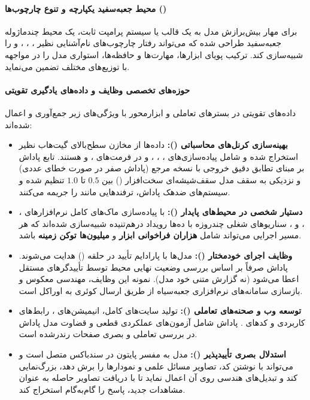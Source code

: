 \paragraph*{محیط جعبه‌سفید یکپارچه و تنوع چارچوب‌ها ()}
برای مهار بیش‌برازش مدل به یک قالب یا سیستم پرامپت ثابت، یک محیط چندماژوله جعبه‌سفید طراحی شده که می‌تواند رفتار چارچوب‌های نام‌آشنایی نظیر  \cite{kimicli2026}،  \cite{claudecode2026}،  \cite{codex2026}،  \cite{openclaw2026} و  \cite{hermes2026} را شبیه‌سازی کند. ترکیب پویای ابزارها، مهارت‌ها و حافظه‌ها، استواری مدل را در مواجهه با توزیع‌های مختلف تضمین می‌نماید.

\paragraph*{حوزه‌های تخصصی وظایف و داده‌های یادگیری تقویتی}
داده‌های تقویتی در بسترهای تعاملی و ابزارمحور با ویژگی‌های زیر جمع‌آوری و اعمال شده‌اند:
\begin{itemize}
    \item \textbf{بهینه‌سازی کرنل‌های محاسباتی  ():} داده‌ها از مخازن سطح‌بالای گیت‌هاب نظیر  \cite{yang2024fla} استخراج شده و شامل پیاده‌سازی‌های ،  \cite{tillet2019triton}، ،  \cite{spector2025thunderkittens} و  \cite{wang2025tilelang} در فرمت‌های ،  و  هستند. تابع پاداش بر مبنای تطابق دقیق خروجی با نسخه مرجع  (پاداش صفر در صورت خطای عددی) و نزدیکی به سقف مدل سقف‌شیشه‌ای سخت‌افزار () بین $0.5$ تا $1.0$ تنظیم شده و سیستم‌های ضدهک پاداش، ترفندهایی مانند  را جریمه می‌کنند.
    \item \textbf{دستیار شخصی در محیط‌های پایدار ():} با پیاده‌سازی ماک‌های کامل نرم‌افزارهای ، ،  و ، سناریوهای شغلی چندروزه با ده‌ها رویداد درهم‌تنیده شبیه‌سازی شده‌اند که هر مسیر اجرایی می‌تواند شامل \textbf{هزاران فراخوانی ابزار} و \textbf{میلیون‌ها توکن زمینه} باشد.
    \item \textbf{وظایف اجرای خودمختار ():} مدل‌ها با پارادایم تأیید در حلقه () هدایت می‌شوند. پاداش صرفاً بر اساس بررسی وضعیت نهایی محیط توسط تأییدگرهای مستقل اعطا می‌شود (نه گزارش متنی خود مدل). نمونه این وظایف، مهندسی معکوس و بازسازی سامانه‌های نرم‌افزاری جعبه‌سیاه از طریق ارسال کوئری به اوراکل است.
    \item \textbf{توسعه وب و صحنه‌های تعاملی ():} تولید سایت‌های کامل، انیمیشن‌های ، رابط‌های کاربردی و کدهای . پاداش شامل آزمون‌های عملکردی قطعی و قضاوت مدل پاداش در بررسی تعاملی و بصری صفحات رندرشده است.
    \item \textbf{استدلال بصری تأییدپذیر ():} مدل به مفسر پایتون در سندباکس متصل است و می‌تواند با نوشتن کد، تصاویر مسائل علمی و نمودارها را برش دهد، بزرگ‌نمایی کند و تبدیل‌های هندسی روی آن اعمال نماید تا با دریافت تصاویر حاصله به عنوان مشاهدات جدید، پاسخ را گام‌به‌گام استخراج کند.
\end{itemize}

